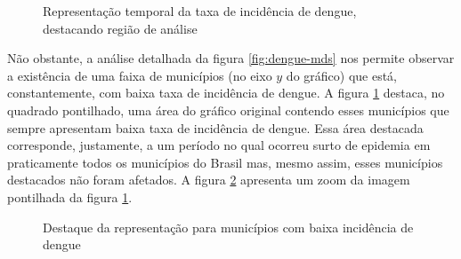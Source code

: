 \documentclass[12pt,openright,twoside,a4paper,article,brazil]{abntex2}
\begin{document}
\begin{figure}[h]
	\centering
	\caption{Representação temporal da taxa de incidência de dengue, destacando região de análise}
	\label{fig:dengue-mds-destaque}
\end{figure}

Não obstante, a análise detalhada da figura \ref{fig:dengue-mds} nos permite observar a existência de uma faixa de municípios (no eixo $y$ do gráfico) que está, constantemente, com baixa taxa de incidência de dengue. A figura \ref{fig:dengue-mds-destaque} destaca, no quadrado pontilhado, uma área do gráfico original contendo esses municípios que sempre apresentam baixa taxa de incidência de dengue. Essa área destacada corresponde, justamente, a um período no qual ocorreu surto de epidemia em praticamente todos os municípios do Brasil mas, mesmo assim, esses municípios destacados não foram afetados. A figura \ref{fig:dengue-mds-zoom} apresenta um zoom da imagem pontilhada da figura \ref{fig:dengue-mds-destaque}.

\begin{figure}[h]
	\centering
	\caption{Destaque da representação para municípios com baixa incidência de dengue}
	\label{fig:dengue-mds-zoom}
\end{figure}
\end{document}

